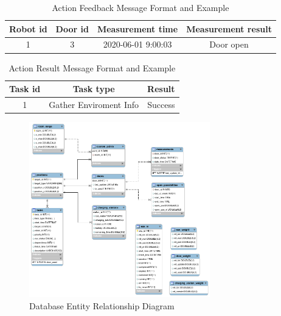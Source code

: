 \begin{table}[htb]
\centering
\begin{tabular}{|c|c|c|c|} 
\hline
Robot id & Door id & Measurement time & Measurement result \\
\hline\hline
1	& 3	& 2020-06-01 9:00:03 & Door open \\ [1ex] 
\hline
\end{tabular}
\caption{Action Feedback Message Format and Example}
\label{tab:feedback_message}
\end{table}

\begin{table}[htb]
\centering
\begin{tabular}{|c|c|c|} 
\hline
Task id	& Task type	& Result\\
\hline\hline
1 & Gather Enviroment Info & Success \\ [1ex] 
\hline
\end{tabular}
\caption{Action Result Message Format and Example}
\label{tab:result_message}
\end{table}


\begin{figure}[htbp]
    \centering
    \includegraphics[width = 0.7\textwidth]{content/images/ch4/database_er.png}
    \caption{Database Entity Relationship Diagram}
    \label{fig:database_er}
\end{figure}


